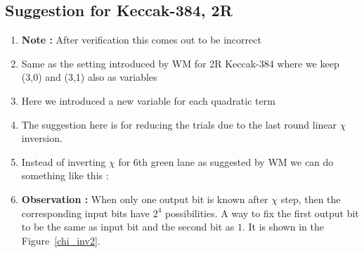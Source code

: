 \documentclass{article}
\begin{document}
    \subsection{Suggestion for Keccak-384, 2R}
\begin{enumerate}
    \item \textbf{Note :} After verification this comes out to be incorrect
    \item Same as the setting introduced by WM for 2R Keccak-384 where we keep (3,0) and (3,1) also as variables
    \item Here we introduced a new variable for each quadratic term
    \item The suggestion here is for reducing the trials due to the last round linear $\chi$ inversion.
    \item Instead of inverting $\chi$ for 6th green lane as suggested by WM we can do something like this :
    \item \label{ob2}\textbf{Observation :} When only one output bit is known after $\chi$ step, then the corresponding input bits have $2^4$ possibilities. A way to fix the first output bit to be the same as input bit and the second bit as $1$. It is shown in the Figure~\ref{chi_inv2}.
\begin{figure}[ht]
\begin{center}
\end{center}
\end{figure}
\end{enumerate}
\end{document}
